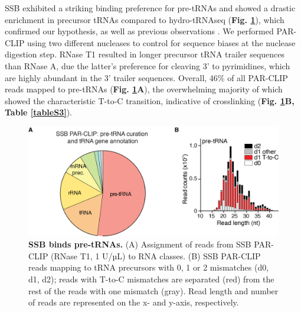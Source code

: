 \documentclass[12pt]{rockefeller}
\begin{document}
SSB exhibited a striking binding preference for pre-tRNAs and showed a drastic enrichment in precursor tRNAs compared to hydro-tRNAseq (\textbf{Fig. \ref{paper2cd}}), which confirmed our hypothesis, as well as previous observations \cite{Bayfield:2009cx}. We performed PAR-CLIP using two different nucleases to control for sequence biases at the nuclease digestion step. RNase T1 resulted in longer precursor tRNA trailer sequences than RNase A, due the latter’s preference for cleaving 3’ to pyrimidines, which are highly abundant in the 3’ trailer sequences. Overall, 46\% of all PAR-CLIP reads mapped to pre-tRNAs (\textbf{Fig. \ref{paper2cd}A}), the overwhelming majority of which showed the characteristic T-to-C transition, indicative of crosslinking (\textbf{Fig. \ref{paper2cd}B, Table \ref{tableS3}}).


\begin{figure}[!ht]%
\centering
\includegraphics[width=\textwidth]{paper2cd.png}%
\caption[SSB binds pre-tRNAs.]
{
\textbf{SSB binds pre-tRNAs.}
(A) Assignment of reads from SSB PAR-CLIP (RNase T1, 1 U/µL) to RNA classes. (B) SSB PAR-CLIP reads mapping to tRNA precursors with 0, 1 or 2 mismatches (d0, d1, d2); reads with T-to-C mismatches are separated (red) from the rest of the reads with one mismatch (gray). Read length and number of reads are represented on the x- and y-axis, respectively. 
}
\centering
\label{paper2cd}%
\end{figure}
\end{document}
